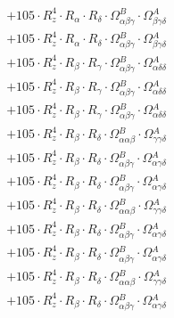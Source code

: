 \documentclass{article}
\begin{document}
\begin{subequations}
\begin{gather}
\begin{array}{c}
 \\[0.2em] 		 + 105 \cdot R_{z}^{4} \cdot R_{\alpha{}} \cdot R_{\delta{}} \cdot \Omega{}^{B}_{\alpha{}\beta{}\gamma{}} \cdot \Omega{}^{A}_{\beta{}\gamma{}\delta{}} 
 \\[0.2em] 		 + 105 \cdot R_{z}^{4} \cdot R_{\alpha{}} \cdot R_{\delta{}} \cdot \Omega{}^{B}_{\alpha{}\beta{}\gamma{}} \cdot \Omega{}^{A}_{\beta{}\gamma{}\delta{}} 
 \\[0.2em] 		 + 105 \cdot R_{z}^{4} \cdot R_{\beta{}} \cdot R_{\gamma{}} \cdot \Omega{}^{B}_{\alpha{}\beta{}\gamma{}} \cdot \Omega{}^{A}_{\alpha{}\delta{}\delta{}} 
 \\[0.2em] 		 + 105 \cdot R_{z}^{4} \cdot R_{\beta{}} \cdot R_{\gamma{}} \cdot \Omega{}^{B}_{\alpha{}\beta{}\gamma{}} \cdot \Omega{}^{A}_{\alpha{}\delta{}\delta{}} 
 \\[0.2em] 		 + 105 \cdot R_{z}^{4} \cdot R_{\beta{}} \cdot R_{\gamma{}} \cdot \Omega{}^{B}_{\alpha{}\beta{}\gamma{}} \cdot \Omega{}^{A}_{\alpha{}\delta{}\delta{}} 
 \\[0.2em] 		 + 105 \cdot R_{z}^{4} \cdot R_{\beta{}} \cdot R_{\delta{}} \cdot \Omega{}^{B}_{\alpha{}\alpha{}\beta{}} \cdot \Omega{}^{A}_{\gamma{}\gamma{}\delta{}} 
 \\[0.2em] 		 + 105 \cdot R_{z}^{4} \cdot R_{\beta{}} \cdot R_{\delta{}} \cdot \Omega{}^{B}_{\alpha{}\beta{}\gamma{}} \cdot \Omega{}^{A}_{\alpha{}\gamma{}\delta{}} 
 \\[0.2em] 		 + 105 \cdot R_{z}^{4} \cdot R_{\beta{}} \cdot R_{\delta{}} \cdot \Omega{}^{B}_{\alpha{}\beta{}\gamma{}} \cdot \Omega{}^{A}_{\alpha{}\gamma{}\delta{}} 
 \\[0.2em] 		 + 105 \cdot R_{z}^{4} \cdot R_{\beta{}} \cdot R_{\delta{}} \cdot \Omega{}^{B}_{\alpha{}\alpha{}\beta{}} \cdot \Omega{}^{A}_{\gamma{}\gamma{}\delta{}} 
 \\[0.2em] 		 + 105 \cdot R_{z}^{4} \cdot R_{\beta{}} \cdot R_{\delta{}} \cdot \Omega{}^{B}_{\alpha{}\beta{}\gamma{}} \cdot \Omega{}^{A}_{\alpha{}\gamma{}\delta{}} 
 \\[0.2em] 		 + 105 \cdot R_{z}^{4} \cdot R_{\beta{}} \cdot R_{\delta{}} \cdot \Omega{}^{B}_{\alpha{}\beta{}\gamma{}} \cdot \Omega{}^{A}_{\alpha{}\gamma{}\delta{}} 
 \\[0.2em] 		 + 105 \cdot R_{z}^{4} \cdot R_{\beta{}} \cdot R_{\delta{}} \cdot \Omega{}^{B}_{\alpha{}\alpha{}\beta{}} \cdot \Omega{}^{A}_{\gamma{}\gamma{}\delta{}} 
 \\[0.2em] 		 + 105 \cdot R_{z}^{4} \cdot R_{\beta{}} \cdot R_{\delta{}} \cdot \Omega{}^{B}_{\alpha{}\beta{}\gamma{}} \cdot \Omega{}^{A}_{\alpha{}\gamma{}\delta{}} 

\end{array}
\end{gather}
\end{subequations}
\end{document}
